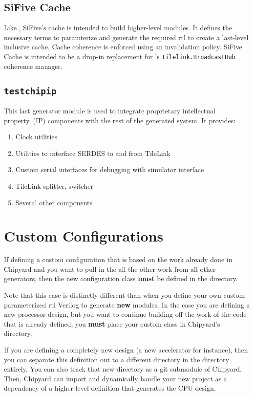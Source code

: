 \subsection{SiFive Cache}\label{sec:SiFive_Cache}
\nocite{siFiveCacheGithub}
Like , SiFive's cache is intended to build higher-level modules.
It defines the necessary terms to paramterize and generate the required \gls{rtl} to create a last-level inclusive cache.
Cache coherence is enforced using an invalidation policy.
SiFive Cache is intended to be a drop-in replacement for 's \texttt{tilelink.BroadcastHub} coherence manager.

\subsection{\texttt{testchipip}}\label{sec:testchipip}
\nocite{testchipipGithub}
This last generator module is used to integrate proprietary intellectual property~(IP) components with the rest of the generated system.
It provides:
\begin{enumerate}
\item Clock utilities
\item Utilities to interface SERDES to and from TileLink
\item Custom serial interfaces for debugging with simulator interface
\item TileLink splitter, switcher
\item Several other components
\end{enumerate}

\section{Custom Configurations}\label{sec:Custom_Configurations}
If defining a custom configuration that is based on the work already done in Chipyard and you want to pull in the all the other work from all other generators, then the new configuration class \textbf{must} be defined in the  directory.

\begin{blackbox}
  Note that this case is distinctly different than when you define your own custom parameterized \gls{rtl} Verilog to generate \textbf{new} modules.
  In the case you are defining a new processor design, but you want to continue building off the work of the code that is already defined, you \textbf{must} place your custom class in Chipyard's  directory.

  If you are defining a completely new design (a new \gls{accelerator} for instance), then you can separate this definition out to a different directory in the  directory entirely.
  You can also track that new directory as a git submodule of Chipyard.
  Then, Chipyard can import and dynamically handle your new project as a dependency of a higher-level definition that generates the CPU design.
\end{blackbox}

